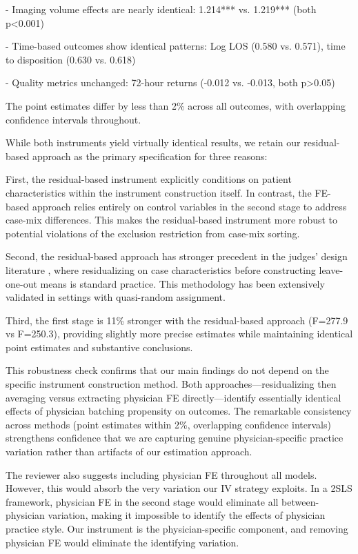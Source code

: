 \documentclass[11pt]{article}
\newcommand{\1}{\hbox{\rm 1\kern-.35em 1}}
\begin{document}
- Imaging volume effects are nearly identical: 1.214*** vs. 1.219*** (both p<0.001)

- Time-based outcomes show identical patterns: Log LOS (0.580 vs. 0.571), time to disposition (0.630 vs. 0.618)

- Quality metrics unchanged: 72-hour returns (-0.012 vs. -0.013, both p>0.05)

The point estimates differ by less than 2\% across all outcomes, with overlapping confidence intervals throughout.

While both instruments yield virtually identical results, we retain our residual-based approach as the primary specification for three reasons:

First, the residual-based instrument explicitly conditions on patient characteristics within the instrument construction itself. In contrast, the FE-based approach relies entirely on control variables in the second stage to address case-mix differences. This makes the residual-based instrument more robust to potential violations of the exclusion restriction from case-mix sorting.

Second, the residual-based approach has stronger precedent in the judges' design literature \citep{Eichmeyer2022, dobbie2018effects, bhuller2020incarceration}, where residualizing on case characteristics before constructing leave-one-out means is standard practice. This methodology has been extensively validated in settings with quasi-random assignment.

Third, the first stage is 11\% stronger with the residual-based approach (F=277.9 vs F=250.3), providing slightly more precise estimates while maintaining identical point estimates and substantive conclusions.

This robustness check confirms that our main findings do not depend on the specific instrument construction method. Both approaches—residualizing then averaging versus extracting physician FE directly—identify essentially identical effects of physician batching propensity on outcomes. The remarkable consistency across methods (point estimates within 2\%, overlapping confidence intervals) strengthens confidence that we are capturing genuine physician-specific practice variation rather than artifacts of our estimation approach.

The reviewer also suggests including physician FE throughout all models. However, this would absorb the very variation our IV strategy exploits. In a 2SLS framework, physician FE in the second stage would eliminate all between-physician variation, making it impossible to identify the effects of physician practice style. Our instrument is the physician-specific component, and removing physician FE would eliminate the identifying variation.
\end{document}
